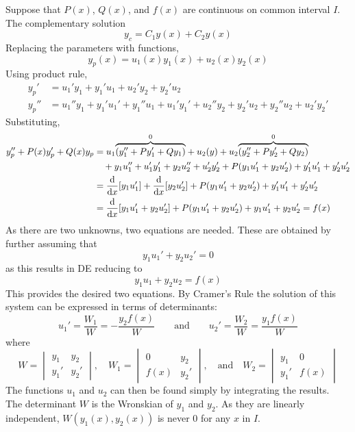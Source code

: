\documentclass[./Differential Equations]{subfiles}
\begin{document}
				Suppose that \(P(x)\), \(Q(x)\), and \(f(x)\) are continuous on common interval \(I\). The complementary solution 
				\[y_c = C_1y(x) + C_2y(x)\]
				Replacing the parameters with functions,
				\[y_p(x) = u_1(x)y_1(x) + u_2(x)y_2(x)\]
				Using product rule,
				\begin{align*}
					y_p' &= u_1'y_1 + y_1'u_1 + u_2'y_2 + y_2'u_2 \\
					y_p'' &= u_1''y_1 + y_1'u_1' + y_1''u_1 + u_1'y_1' + u_2''y_2 + y_2'u_2 + y_2''u_2 + u_2'y_2'
				\end{align*}
				Substituting,
				\begin{align*}
					y_p'' + P(x)y_p' + Q(x)y_p &= u_1 \overset{0}{\overbrace{(y_1'' + Py_1' + Qy_1)}} + u_2(y) + u_2\overset{0}{\overbrace{(y_2'' + Py_2' + Qy_2)}} \\
						&\quad + y_1u_1'' + u_1'y_1' + y_2u_2'' + u_2'y_2' + P(y_1u_1' + y_2u_2') + y_1'u_1' + y_2'u_2'\\
						&= \dv{}{x}[y_1u_1'] + \dv{}{x}[y_2u_2'] + P(y_1u_1' + y_2u_2') + y_1'u_1' + y_2'u_2' \\
						&= \dv{}{x}[y_1u_1' + y_2u_2'] + P(y_1u_1' + y_2u_2') + y_1u_1' + y_2u_2'
								= f(x)
				\end{align*}
				As there are two unknowns, two equations are needed. These are obtained by further assuming that
				\[y_1u_1' + y_2u_2' = 0\]
				as this results in DE reducing to
				\[y_1u_1 + y_2u_2 = f(x)\]
				This provides the desired two equations. By Cramer's Rule the solution of this system can be expressed in terms of determinants:
				\[
					u_1' = \frac{W_1}{W} = -\frac{y_2f(x)}{W} \qquad \text{and} \qquad
						u_2' = \frac{W_2}{W} = \frac{y_1f(x)}{W}
				\]
				where
				\[
					W = \begin{vmatrix}
 							y_1 & y_2 \\
 							y_1' & y_2'
 						\end{vmatrix}, \quad
 						W_1 = \begin{vmatrix}
 									0 & y_2 \\
 									f(x) & y_2'
 								\end{vmatrix}, \quad \text{and} \quad
						W_2 = \begin{vmatrix}
 									y_1 & 0 \\
 									y_1' & f(x)
 								\end{vmatrix}
				\]
				The functions \(u_1\) and \(u_2\) can then be found simply by integrating the results. \\
				The determinant \(W\) is the Wronskian of \(y_1\) and \(y_2\). As they are linearly independent, \(W(y_1(x), y_2(x))\) is never 0 for any \(x\) in \(I\).
				
\end{document}
